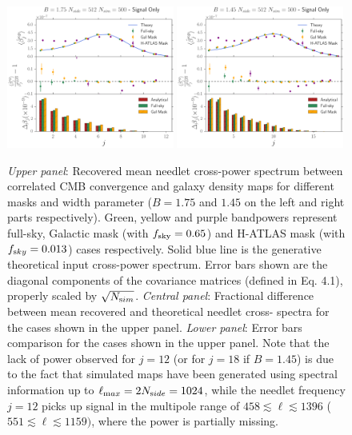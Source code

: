\begin{figure}[tbp]
\centering %
\includegraphics[width=0.49\textwidth]{Chapter5/Images/pipeline_val_needlet_nside512_nsim500_jmax12.pdf}
\includegraphics[width=0.49\textwidth]{Chapter5/Images/pipeline_val_needlet_nside512_nsim500_jmax18.pdf}
\caption{\label{fig:needsims} \emph{Upper panel}: Recovered mean needlet cross-power spectrum  
between correlated CMB convergence and galaxy density maps for different masks and width parameter
($B=1.75$ and $1.45$ on the left and right parts respectively). Green, yellow and purple 
bandpowers represent full-sky, Galactic mask (with $f_{\rm{sky}} = 0.65$) and H-ATLAS mask (with $f_{\rm 
sky} = 0.013$) cases respectively. Solid blue line is the generative theoretical input cross-power spectrum. 
Error bars shown are the diagonal components of the covariance matrices (defined in Eq. 4.1), properly 
scaled by $\sqrt{N_{\rm sim}}$. \emph{Central panel}: Fractional difference between mean recovered and 
theoretical needlet cross- spectra for the cases shown in the upper panel. \emph{Lower panel}: Error bars 
comparison for the cases shown in the upper panel. Note that the 
lack of power observed for $j = 12$ (or for $j=18$ if $B=1.45$) is due to the fact that simulated maps have been generated using 
spectral information up to $\ell_{\rm max}=2N_{\rm side}= 1024$, while the needlet frequency $j=12$
picks up signal in the multipole range of $458 \lesssim \ell \lesssim 1396$ ($551 \lesssim \ell \lesssim 1159)$, where the power is partially 
missing.}
\end{figure}
%

